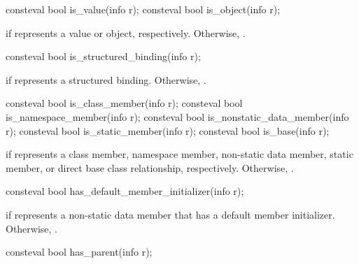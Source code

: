%
%
\begin{itemdecl}
consteval bool is_value(info r);
consteval bool is_object(info r);
\end{itemdecl}

\begin{itemdescr}
\pnum
\returns
{} if  represents a value or object, respectively.
Otherwise, .
\end{itemdescr}

%
\begin{itemdecl}
consteval bool is_structured_binding(info r);
\end{itemdecl}

\begin{itemdescr}
\pnum
\returns
{} if  represents a structured binding.
Otherwise, .
\end{itemdescr}

%
%
%
%
%
\begin{itemdecl}
consteval bool is_class_member(info r);
consteval bool is_namespace_member(info r);
consteval bool is_nonstatic_data_member(info r);
consteval bool is_static_member(info r);
consteval bool is_base(info r);
\end{itemdecl}

\begin{itemdescr}
\pnum
\returns
{} if  represents a
class member,
namespace member,
non-static data member,
static member, or
direct base class relationship, respectively.
Otherwise, .
\end{itemdescr}

%
\begin{itemdecl}
consteval bool has_default_member_initializer(info r);
\end{itemdecl}

\begin{itemdescr}
\pnum
\returns
{} if  represents a non-static data member
that has a default member initializer.
Otherwise, .
\end{itemdescr}

%
\begin{itemdecl}
consteval bool has_parent(info r);
\end{itemdecl}

